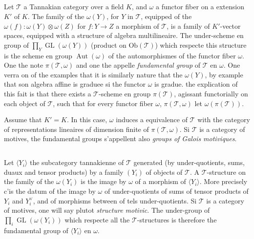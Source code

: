 \documentclass[11pt,a4paper]{article}
\theoremstyle{plain}
\theoremstyle{definition}
\DeclareMathOperator{\Aut}{Aut}
\DeclareMathOperator{\GL}{GL}
\begin{document}
\subsection{}\label{ssec:5.5}

Let $\mathcal{T}$ a Tannakian category over a field $K$, and $\omega$ a functor fiber on a extension $K'$ of $K$. The family of the $\omega(Y)$, for $Y$ in $\mathcal{T}$, equipped of the $\omega(f): \omega(Y) \otimes \omega(Z)$ for $f: Y \to Z$ a morphism of $\mathcal{T}$, is a family of $K'$-vector spaces, equipped with a structure of algebra multilineaire. The under-scheme en group of $\prod_{Y} \GL(\omega(Y))$ (product on $\mathrm{Ob}(\mathcal{T})$) which respecte this structure is the scheme en group $\Aut(\omega)$ of the automorphismes of the functor fiber $\omega$. One the note $\pi(\mathcal{T},\omega)$ and one the appelle \emph{fundamental group} of $\mathcal{T}$ en $\omega$. One verra on of the examples that it is similarly nature that the $\omega(Y)$, by example that son algebra affine is graduee si the functor $\omega$ is gradue. the explication of this fait is that there exists a $\mathcal{T}$-scheme en group $\pi(\mathcal{T})$, agissant functorially on each object of $\mathcal{T}$, such that for every functor fiber $\omega$, $\pi(\mathcal{T},\omega)$ let $\omega(\pi(\mathcal{T}))$.

Assume that $K' = K$. In this case, $\omega$ induces a equivalence of $\mathcal{T}$ with the category of representations lineaires of dimension finite of $\pi(\mathcal{T},\omega)$. Si $\mathcal{T}$ is a category of motives, the fundamental groups s'appellent also \emph{groups of Galois motiviques}.

\subsection{}\label{ssec:5.6}

Let $\langle Y_i \rangle$ the subcategory tannakienne of $\mathcal{T}$ generated (by under-quotients, sums, duaux and tensor products) by a family $(Y_i)$ of objects of $\mathcal{T}$. A $\mathcal{T}$-structure on the family of the $\omega(Y_i)$ is the image by $\omega$ of a morphism of $\langle Y_i \rangle$. More precisely c'is the datum of the image by $\omega$ of under-quotients of sums of tensor products of $Y_i$ and $Y_i^{\vee}$, and of morphisms between of tels under-quotients. Si $\mathcal{T}$ is a category of motives, one will say plutot \emph{structure motivic}. The under-group of $\prod_i \GL(\omega(Y_i))$ which respecte all the $\mathcal{T}$-structures is therefore the fundamental group of $\langle Y_i \rangle$ en $\omega$.
\end{document}
